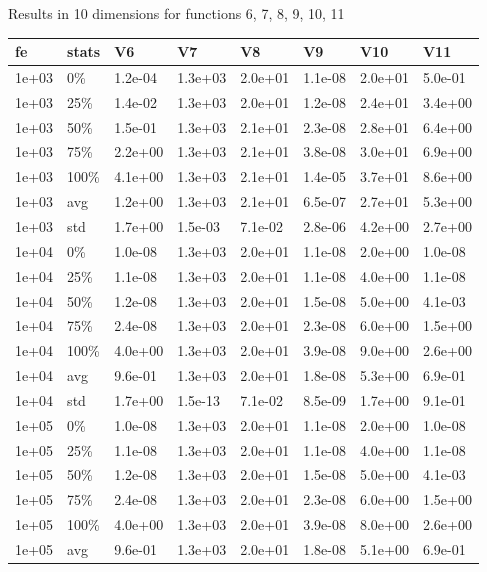 Results in 10 dimensions for functions 6, 7, 8, 9, 10, 11
\begin{longtable}{llllllll}
  \hline
fe & stats & V6 & V7 & V8 & V9 & V10 & V11 \\ 
  \hline
1e+03 & 0\% & 1.2e-04 & 1.3e+03 & 2.0e+01 & 1.1e-08 & 2.0e+01 & 5.0e-01 \\ 
  1e+03 & 25\% & 1.4e-02 & 1.3e+03 & 2.0e+01 & 1.2e-08 & 2.4e+01 & 3.4e+00 \\ 
  1e+03 & 50\% & 1.5e-01 & 1.3e+03 & 2.1e+01 & 2.3e-08 & 2.8e+01 & 6.4e+00 \\ 
  1e+03 & 75\% & 2.2e+00 & 1.3e+03 & 2.1e+01 & 3.8e-08 & 3.0e+01 & 6.9e+00 \\ 
  1e+03 & 100\% & 4.1e+00 & 1.3e+03 & 2.1e+01 & 1.4e-05 & 3.7e+01 & 8.6e+00 \\ 
  1e+03 & avg & 1.2e+00 & 1.3e+03 & 2.1e+01 & 6.5e-07 & 2.7e+01 & 5.3e+00 \\ 
  1e+03 & std & 1.7e+00 & 1.5e-03 & 7.1e-02 & 2.8e-06 & 4.2e+00 & 2.7e+00 \\ 
  1e+04 & 0\% & 1.0e-08 & 1.3e+03 & 2.0e+01 & 1.1e-08 & 2.0e+00 & 1.0e-08 \\ 
  1e+04 & 25\% & 1.1e-08 & 1.3e+03 & 2.0e+01 & 1.1e-08 & 4.0e+00 & 1.1e-08 \\ 
  1e+04 & 50\% & 1.2e-08 & 1.3e+03 & 2.0e+01 & 1.5e-08 & 5.0e+00 & 4.1e-03 \\ 
  1e+04 & 75\% & 2.4e-08 & 1.3e+03 & 2.0e+01 & 2.3e-08 & 6.0e+00 & 1.5e+00 \\ 
  1e+04 & 100\% & 4.0e+00 & 1.3e+03 & 2.0e+01 & 3.9e-08 & 9.0e+00 & 2.6e+00 \\ 
  1e+04 & avg & 9.6e-01 & 1.3e+03 & 2.0e+01 & 1.8e-08 & 5.3e+00 & 6.9e-01 \\ 
  1e+04 & std & 1.7e+00 & 1.5e-13 & 7.1e-02 & 8.5e-09 & 1.7e+00 & 9.1e-01 \\ 
  1e+05 & 0\% & 1.0e-08 & 1.3e+03 & 2.0e+01 & 1.1e-08 & 2.0e+00 & 1.0e-08 \\ 
  1e+05 & 25\% & 1.1e-08 & 1.3e+03 & 2.0e+01 & 1.1e-08 & 4.0e+00 & 1.1e-08 \\ 
  1e+05 & 50\% & 1.2e-08 & 1.3e+03 & 2.0e+01 & 1.5e-08 & 5.0e+00 & 4.1e-03 \\ 
  1e+05 & 75\% & 2.4e-08 & 1.3e+03 & 2.0e+01 & 2.3e-08 & 6.0e+00 & 1.5e+00 \\ 
  1e+05 & 100\% & 4.0e+00 & 1.3e+03 & 2.0e+01 & 3.9e-08 & 8.0e+00 & 2.6e+00 \\ 
  1e+05 & avg & 9.6e-01 & 1.3e+03 & 2.0e+01 & 1.8e-08 & 5.1e+00 & 6.9e-01 \\ 

\end{longtable}
